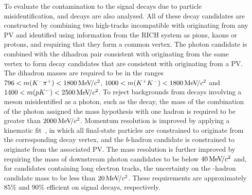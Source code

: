 To evaluate the contamination to the \bdskpig signal decays due to particle misidentification, \bskkg and \lbpkg decays are also analysed.
All of these decay candidates are constructed by combining two high-\pt tracks incompatible with originating from any PV and identified using information from the RICH system as pions, kaons or protons, and requiring that they form a common vertex.
The photon candidate is combined with the dihadron pair consistent with originating from the same vertex to form decay candidates that are consistent with originating from a PV.
The dihadron masses are required to be in the ranges \mbox{$796<m({{{K}^-}{{\pi}^+}})<1800\text{\,Me\kern -0.1em V\!/}c^2$},  \mbox{$1000<m({{K}^+}{{K}^-})<1800\text{\,Me\kern -0.1em V\!/}c^2$} and \mbox{$1400<m(p{{K}^-})<2500\text{\,Me\kern -0.1em V\!/}c^2$}.
To reject backgrounds from decays involving a \piz meson misidentified as a photon, such as the \decay{\Bzb}{\left[\pip\piz\right]_{\rhop}\Km} decay, the mass of the combination of the photon assigned the \piz mass hypothesis with one hadron is required to be greater than $2000\text{\,Me\kern -0.1em V\!/}c^2$.
Momentum resolution is improved by applying a kinematic fit~\cite{Hulsbergen:2005pu}, in which all final-state particles are constrained to originate from the corresponding decay vertex, and the \mbox{$b$-hadron} candidate is constrained to originate from the associated PV.
The mass resolution is further improved by requiring the mass of downstream photon candidates to be below $40\text{\,Me\kern -0.1em V\!/}c^2$ and, for candidates containing long electron tracks, the uncertainty on the \bquark-hadron candidate mass to be less than $20\text{\,Me\kern -0.1em V\!/}c^2$. These requirements are approximately 85\% and 90\% efficient on signal decays, respectively.

